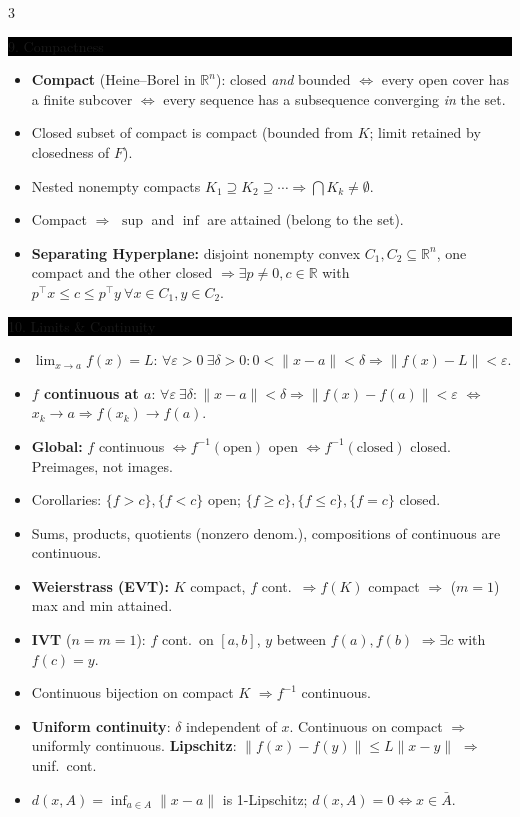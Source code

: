 \documentclass[8pt,letterpaper]{article}
\makeatletter
\newcommand{\sect}[1]{%
  \vspace{2.2pt}%
  \noindent\colorbox{black}{\parbox{\dimexpr\linewidth-2\fboxsep}{%
    \color{white}\bfseries\scshape\fontsize{6.4}{7.4}\selectfont
    \hyphenpenalty=10000\exhyphenpenalty=10000\raggedright #1}}%
  \vspace{1.4pt}\par\nopagebreak\@afterheading}
\newenvironment{tl}
  {\begin{itemize}[leftmargin=6pt,itemsep=0.3pt,topsep=1pt,parsep=0pt,
                   partopsep=0pt,label=\textcolor{gray}{\tiny$\bullet$}]}
  {\end{itemize}}
\newcommand{\R}{\mathbb{R}}
\newcommand{\Rn}{\mathbb{R}^n}
\newcommand{\tp}{^{\!\top}}
\newcommand{\nm}[1]{\lVert #1\rVert}
\makeatother
\begin{document}
\begin{multicols}{3}
\sect{9. Compactness}
\begin{tl}
\item \textbf{Compact} (Heine--Borel in $\Rn$): closed \emph{and} bounded $\iff$ every open cover has a finite subcover $\iff$ every sequence has a subsequence converging \emph{in} the set.
\item Closed subset of compact is compact (bounded from $K$; limit retained by closedness of $F$).
\item Nested nonempty compacts $K_1\supseteq K_2\supseteq\cdots\Rightarrow\bigcap K_k\neq\emptyset$.
\item Compact $\Rightarrow$ $\sup$ and $\inf$ are attained (belong to the set).
\item \textbf{Separating Hyperplane:} disjoint nonempty convex $C_1,C_2\subseteq\Rn$, one compact and the other closed $\Rightarrow\exists p\neq0,c\in\R$ with $p\tp x\le c\le p\tp y\ \forall x\in C_1,y\in C_2$.
\end{tl}

\sect{10. Limits \& Continuity}
\begin{tl}
\item $\lim_{x\to a}f(x)=L$: $\forall\varepsilon>0\ \exists\delta>0: 0<\nm{x-a}<\delta\Rightarrow\nm{f(x)-L}<\varepsilon$.
\item \textbf{$f$ continuous at $a$}: $\forall\varepsilon\ \exists\delta:\nm{x-a}<\delta\Rightarrow\nm{f(x)-f(a)}<\varepsilon$ $\iff$ $x_k\to a\Rightarrow f(x_k)\to f(a)$.
\item \textbf{Global:} $f$ continuous $\iff f^{-1}(\text{open})$ open $\iff f^{-1}(\text{closed})$ closed. \colorbox{black!12}{Preimages, not images.}
\item Corollaries: $\{f>c\},\{f<c\}$ open; $\{f\ge c\},\{f\le c\},\{f=c\}$ closed.
\item Sums, products, quotients (nonzero denom.), compositions of continuous are continuous.
\item \textbf{Weierstrass (EVT):} $K$ compact, $f$ cont.\ $\Rightarrow f(K)$ compact $\Rightarrow$ ($m=1$) max and min attained.
\item \textbf{IVT} ($n=m=1$): $f$ cont.\ on $[a,b]$, $y$ between $f(a),f(b)$ $\Rightarrow\exists c$ with $f(c)=y$.
\item Continuous bijection on compact $K$ $\Rightarrow f^{-1}$ continuous.
\item \textbf{Uniform continuity}: $\delta$ independent of $x$. Continuous on compact $\Rightarrow$ uniformly continuous. \textbf{Lipschitz}: $\nm{f(x)-f(y)}\le L\nm{x-y}$ $\Rightarrow$ unif.\ cont.
\item $d(x,A)=\inf_{a\in A}\nm{x-a}$ is 1-Lipschitz; $d(x,A)=0\iff x\in\bar A$.
\end{tl}


\end{multicols}
\end{document}

